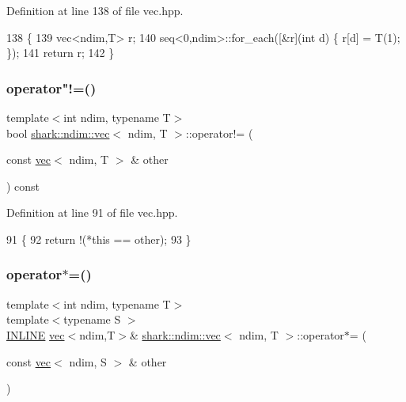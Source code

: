 Definition at line 138 of file vec.\+hpp.


\begin{DoxyCode}
138                                             \{
139             vec<ndim,T> r;
140             seq<0,ndim>::for\_each([&r](\textcolor{keywordtype}{int} d) \{ r[d] = T(1); \});
141             \textcolor{keywordflow}{return} r;
142         \}
\end{DoxyCode}
\hypertarget{structshark_1_1ndim_1_1vec_af57ada01823047ae447cc294e4c4bfe0}{}\label{structshark_1_1ndim_1_1vec_af57ada01823047ae447cc294e4c4bfe0} 
\subsubsection{\texorpdfstring{operator"!=()}{operator!=()}}
{\footnotesize\ttfamily template$<$int ndim, typename T$>$ \\
bool \hyperlink{structshark_1_1ndim_1_1vec}{shark\+::ndim\+::vec}$<$ ndim, T $>$\+::operator!= (\begin{DoxyParamCaption}\item[{const \hyperlink{structshark_1_1ndim_1_1vec}{vec}$<$ ndim, T $>$ \&}]{other }\end{DoxyParamCaption}) const\hspace{0.3cm}{\ttfamily [inline]}}



Definition at line 91 of file vec.\+hpp.


\begin{DoxyCode}
91                                                                           \{
92             \textcolor{keywordflow}{return} !(*\textcolor{keyword}{this} == other);
93         \}
\end{DoxyCode}
\hypertarget{structshark_1_1ndim_1_1vec_a3b6b703d38be32f4d543718743026582}{}\label{structshark_1_1ndim_1_1vec_a3b6b703d38be32f4d543718743026582} 
\subsubsection{\texorpdfstring{operator$\ast$=()}{operator*=()}\hspace{0.1cm}{\footnotesize\ttfamily [1/2]}}
{\footnotesize\ttfamily template$<$int ndim, typename T$>$ \\
template$<$typename S $>$ \\
\hyperlink{common_8hpp_a2eb6f9e0395b47b8d5e3eeae4fe0c116}{I\+N\+L\+I\+NE} \hyperlink{structshark_1_1ndim_1_1vec}{vec}$<$ndim,T$>$\& \hyperlink{structshark_1_1ndim_1_1vec}{shark\+::ndim\+::vec}$<$ ndim, T $>$\+::operator$\ast$= (\begin{DoxyParamCaption}\item[{const \hyperlink{structshark_1_1ndim_1_1vec}{vec}$<$ ndim, S $>$ \&}]{other }\end{DoxyParamCaption})}

